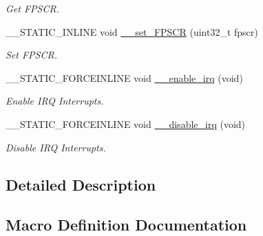 \begin{DoxyCompactItemize}
\begin{DoxyCompactList}\small\item\em Get F\+P\+S\+CR. \end{DoxyCompactList}\item 
\+\_\+\+\_\+\+S\+T\+A\+T\+I\+C\+\_\+\+I\+N\+L\+I\+NE void \hyperlink{group___c_m_s_i_s___core___reg_acc_functions_ga63aa6f7ed41dcaf39cbccb11e812ad4e}{\+\_\+\+\_\+set\+\_\+\+F\+P\+S\+CR} (uint32\+\_\+t fpscr)
\begin{DoxyCompactList}\small\item\em Set F\+P\+S\+CR. \end{DoxyCompactList}\item 
\+\_\+\+\_\+\+S\+T\+A\+T\+I\+C\+\_\+\+F\+O\+R\+C\+E\+I\+N\+L\+I\+NE void \hyperlink{group___c_m_s_i_s___core___reg_acc_functions_gae84bf4e95944e61937f4ed2453e5ef23}{\+\_\+\+\_\+enable\+\_\+irq} (void)
\begin{DoxyCompactList}\small\item\em Enable I\+RQ Interrupts. \end{DoxyCompactList}\item 
\+\_\+\+\_\+\+S\+T\+A\+T\+I\+C\+\_\+\+F\+O\+R\+C\+E\+I\+N\+L\+I\+NE void \hyperlink{group___c_m_s_i_s___core___reg_acc_functions_ga2299877e4ba3e162ca9dbabd6e0abef6}{\+\_\+\+\_\+disable\+\_\+irq} (void)
\begin{DoxyCompactList}\small\item\em Disable I\+RQ Interrupts. \end{DoxyCompactList}\end{DoxyCompactItemize}


\subsection{Detailed Description}


\subsection{Macro Definition Documentation}
\mbox{\label{group___c_m_s_i_s___core___reg_acc_functions_ga4d0739b1355ca5642a7ce76df1271f01}} 
